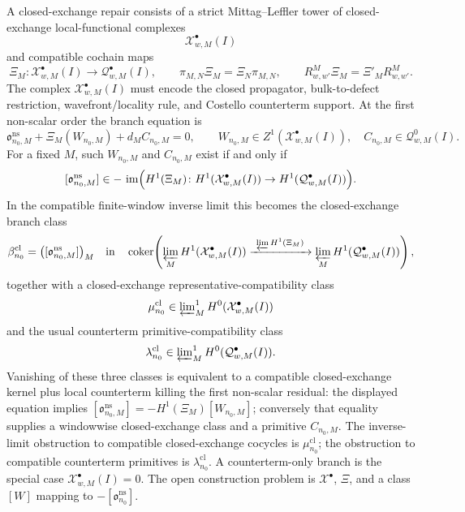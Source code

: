 \begin{enumerate}
	  A closed-exchange repair consists of a strict Mittag--Leffler tower
	  of closed-exchange local-functional complexes
	  \[
	    \mathcal X^\bullet_{w,M}(I)
	  \]
	  and compatible cochain maps
	  \[
	    \Xi_M\colon
	    \mathcal X^\bullet_{w,M}(I)
	      \longrightarrow
	    \mathcal Q^\bullet_{w,M}(I),
	    \qquad
	    \pi_{M,N}\Xi_M=\Xi_N\pi_{M,N},
	    \qquad
	    R^M_{w,w'}\Xi_M=\Xi'_M R^M_{w,w'} .
	  \]
	  The complex \(\mathcal X^\bullet_{w,M}(I)\) must encode the closed
	  propagator, bulk-to-defect restriction, wavefront/locality rule, and
	  Costello counterterm support.  At the first non-scalar order the
	  branch equation is
	  \[
	    \mathfrak o^{\mathrm{ns}}_{n_0,M}
	      +\Xi_M(W_{n_0,M})
	      +d_M C_{n_0,M}=0,
	    \qquad
	    W_{n_0,M}\in Z^1(\mathcal X^\bullet_{w,M}(I)),\quad
	    C_{n_0,M}\in\mathcal Q^0_{w,M}(I).
	  \]
	  For a fixed \(M\), such \(W_{n_0,M}\) and \(C_{n_0,M}\) exist
	  if and only if
	  \[
	    [\mathfrak o^{\mathrm{ns}}_{n_0,M}]
	      \in
	    -\,\operatorname{im}
	    \Bigl(
	      H^1(\Xi_M)\colon
	      H^1(\mathcal X^\bullet_{w,M}(I))
	      \to
	      H^1(\mathcal Q^\bullet_{w,M}(I))
	    \Bigr).
	  \]
	  In the compatible finite-window inverse limit this becomes the
	  closed-exchange branch class
	  \[
	    \beta^{\mathrm{cl}}_{n_0}
	      =
	      \bigl([\mathfrak o^{\mathrm{ns}}_{n_0,M}]\bigr)_M
	      \quad\text{in}\quad
	      \operatorname{coker}\!\left(
	        \varprojlim_M H^1(\mathcal X^\bullet_{w,M}(I))
	        \xrightarrow{\ \varprojlim H^1(\Xi_M)\ }
	        \varprojlim_M H^1(\mathcal Q^\bullet_{w,M}(I))
	      \right),
	  \]
	  together with a closed-exchange representative-compatibility class
	  \[
	    \mu^{\mathrm{cl}}_{n_0}
	      \in
	      \varprojlim\nolimits^1_M
	      H^0(\mathcal X^\bullet_{w,M}(I))
	  \]
	  and the usual counterterm primitive-compatibility class
	  \[
	    \lambda^{\mathrm{cl}}_{n_0}
	      \in
	      \varprojlim\nolimits^1_M
	      H^0(\mathcal Q^\bullet_{w,M}(I)).
	  \]
	  Vanishing of these three classes is equivalent to a compatible
	  closed-exchange kernel plus local counterterm killing the first
	  non-scalar residual: the displayed equation implies
	  \([\mathfrak o^{\mathrm{ns}}_{n_0,M}]
	  =-H^1(\Xi_M)[W_{n_0,M}]\); conversely that equality supplies a
	  windowwise closed-exchange class and a primitive \(C_{n_0,M}\).
	  The inverse-limit obstruction to compatible closed-exchange
	  cocycles is \(\mu^{\mathrm{cl}}_{n_0}\); the obstruction to
	  compatible counterterm primitives is \(\lambda^{\mathrm{cl}}_{n_0}\).
	  A counterterm-only branch is the special case
	  \(\mathcal X^\bullet_{w,M}(I)=0\).  The open construction problem
	  is \(\mathcal X^\bullet\), \(\Xi\), and a class \([W]\) mapping to
	  \(-[\mathfrak o^{\mathrm{ns}}_{n_0}]\).


\end{enumerate}
